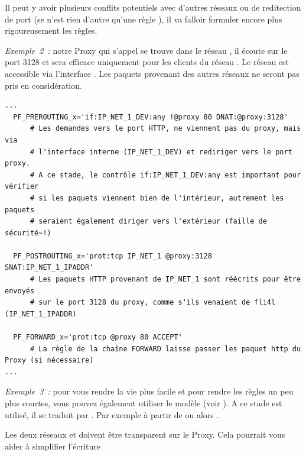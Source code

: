 Il peut y avoir plusieurs conflits potentiels avec d'autres réseaux ou de
reditection de port (se n'est rien d'autre qu'une règle ),
il va falloir formuler encore plus rigoureusement les règles.


\emph{Exemple~2~:} notre Proxy qui s'appel  se trouve dans le réseau
, il écoute sur le port 3128 et sera efficace uniquement pour
les clients du réseau . Le réseau  est accessible
via l'interface . Les paquets provenant des autres réseaux
ne seront pas pris en considération.

\begin{example}
\begin{verbatim}
...
  PF_PREROUTING_x='if:IP_NET_1_DEV:any !@proxy 80 DNAT:@proxy:3128'
      # Les demandes vers le port HTTP, ne viennent pas du proxy, mais via
      # l'interface interne (IP_NET_1_DEV) et rediriger vers le port proxy.
      # A ce stade, le contrôle if:IP_NET_1_DEV:any est important pour vérifier
      # si les paquets viennent bien de l'intérieur, autrement les paquets
      # seraient également diriger vers l'extérieur (faille de sécurité~!)

  PF_POSTROUTING_x='prot:tcp IP_NET_1 @proxy:3128 SNAT:IP_NET_1_IPADDR'
      # Les paquets HTTP provenant de IP_NET_1 sont réécrits pour être envoyés
      # sur le port 3128 du proxy, comme s'ils venaient de fli4l (IP_NET_1_IPADDR)

  PF_FORWARD_x='prot:tcp @proxy 80 ACCEPT'
      # La règle de la chaîne FORWARD laisse passer les paquet http du Proxy (si nécessaire)
...
\end{verbatim}
\end{example}

\emph{Exemple~3~:} pour vous rendre la vie plus facile et pour rendre les
règles un peu plus courtes, vous pouvez également utiliser le modèle (voir
). A ce stade
 est utilisé, il se traduit par .
Par exemple à partir de  ou
alors .

Les deux réseaux  et  doivent être transparent
sur le Proxy. Cela pourrait vous aider à simplifier l'écriture

